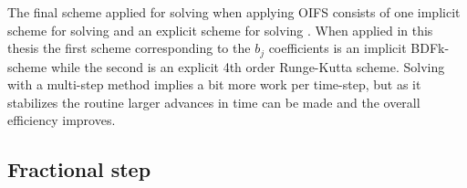 The final scheme applied for solving  when applying OIFS consists of one implicit scheme for 
solving  and an explicit scheme for solving . When applied in this thesis the 
first scheme corresponding to the $b_j$ coefficients is an implicit BDFk-scheme while the second is an explicit 4th order Runge-Kutta scheme. 
Solving~ with a multi-step method implies a bit more work per time-step, but as it stabilizes the routine larger advances in 
time can be made and the overall efficiency improves.


\subsection{Fractional step} 
\label{fracstep}

